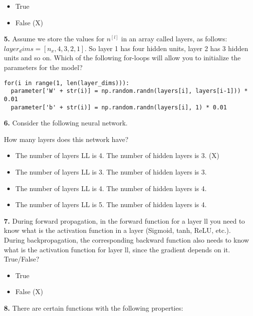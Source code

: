 \begin{itemize}
    \item True
    \item False (X)
\end{itemize}
\textbf{5.} Assume we store the values for $n^{[l]}$ in an array called layers, as follows: $layer_dims = [n_x, 4,3,2,1]$. So layer 1 has four hidden units, layer 2 has 3 hidden units and so on. Which of the following for-loops will allow you to initialize the parameters for the model?
\begin{lstlisting}
for(i in range(1, len(layer_dims))):
  parameter['W' + str(i)] = np.random.randn(layers[i], layers[i-1])) * 0.01
  parameter['b' + str(i)] = np.random.randn(layers[i], 1) * 0.01
\end{lstlisting}
\textbf{6.} Consider the following neural network.

How many layers does this network have?
\begin{itemize}
    \item The number of layers LL is 4. The number of hidden layers is 3. (X)
    \item The number of layers LL is 3. The number of hidden layers is 3.
    \item The number of layers LL is 4. The number of hidden layers is 4.
    \item The number of layers LL is 5. The number of hidden layers is 4.
\end{itemize}
\textbf{7.} During forward propagation, in the forward function for a layer ll you need to know what is the activation function in a layer (Sigmoid, tanh, ReLU, etc.). During backpropagation, the corresponding backward function also needs to know what is the activation function for layer ll, since the gradient depends on it. True/False?
\begin{itemize}
    \item True
    \item False (X)
\end{itemize}
\textbf{8.} There are certain functions with the following properties:

